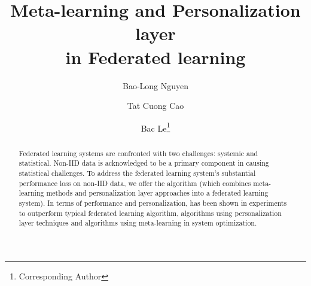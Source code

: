 \documentclass[runningheads]{llncs}
\begin{document}
%
\title{Meta-learning and Personalization layer \\in Federated learning}
%
%
\author{Bao-Long Nguyen \and
Tat Cuong Cao \and Bac Le\thanks{Corresponding Author}}
%
%
%
\maketitle              %
%
\begin{abstract}
Federated learning systems are confronted with two challenges: systemic and statistical. Non-IID data is acknowledged to be a primary component in causing statistical challenges. To address the federated learning system's substantial performance loss on non-IID data, we offer the  algorithm (which combines meta-learning methods and personalization layer approaches into a federated learning system). In terms of performance and personalization,  has been shown in experiments to outperform typical federated learning algorithm, algorithms using personalization layer techniques and algorithms using meta-learning in system optimization.

\end{abstract}
%
%
%
\end{document}
